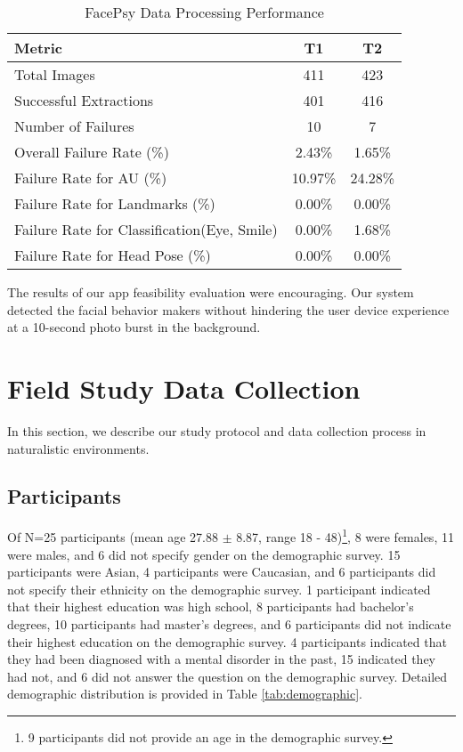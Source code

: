 \begin{table}[h]
\centering
\small
\caption{FacePsy Data Processing Performance}
\begin{tabular}{lcc}
\toprule
\textbf{Metric} & \textbf{T1} & \textbf{T2} \\
\midrule
Total Images & 411 & 423 \\

Successful Extractions & 401 & 416 \\

Number of Failures & 10 & 7 \\

Overall Failure Rate (\%) & 2.43\% & 1.65\% \\

Failure Rate for AU (\%) & 10.97\% & 24.28\% \\

Failure Rate for Landmarks (\%) & 0.00\% & 0.00\% \\

Failure Rate for Classification(Eye, Smile) & 0.00\% & 1.68\% \\

Failure Rate for Head Pose (\%) & 0.00\% & 0.00\% \\
\bottomrule
\end{tabular}

\label{tab:FacePsyPerfromance}
\end{table}


The results of our app feasibility evaluation were encouraging. Our system detected the facial behavior makers without hindering the user device experience at a 10-second photo burst in the background.
\nopagebreak

\section{Field Study Data Collection}
In this section, we describe our study protocol and data collection process in naturalistic environments.

\subsection{Participants}

Of N=25 participants (mean age 27.88 $\pm$ 8.87, range 18 - 48)\footnote{9 participants did not provide an age in the demographic survey.}, 8 were females, 11 were males, and 6 did not specify gender on the demographic survey. 15 participants were Asian, 4 participants were Caucasian, and 6 participants did not specify their ethnicity on the demographic survey. 1 participant indicated that their highest education was high school, 8 participants had bachelor's degrees, 10 participants had master's degrees, and 6 participants did not indicate their highest education on the demographic survey. 4 participants indicated that they had been diagnosed with a mental disorder in the past, 15 indicated they had not, and 6 did not answer the question on the demographic survey. Detailed demographic distribution is provided in Table \ref{tab:demographic}.

